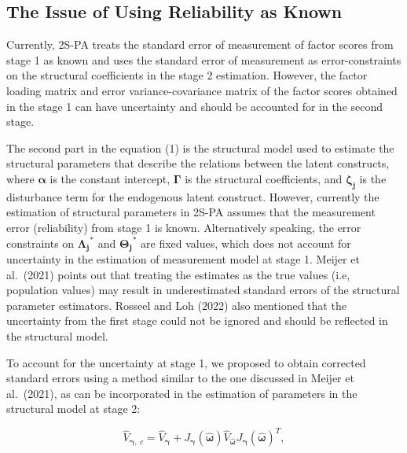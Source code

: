 \documentclass[
  man]{apa7}
\begin{document}
\hypertarget{the-issue-of-using-reliability-as-known}{%
\subsection{The Issue of Using Reliability as Known}\label{the-issue-of-using-reliability-as-known}}

Currently, 2S-PA treats the standard error of measurement of factor scores from stage 1 as known and uses the standard error of measurement as error-constraints on the structural coefficients in the stage 2 estimation. However, the factor loading matrix and error variance-covariance matrix of the factor scores obtained in the stage 1 can have uncertainty and should be accounted for in the second stage.

The second part in the equation (1) is the structural model used to estimate the structural parameters that describe the relations between the latent constructs, where \(\boldsymbol{\alpha}\) is the constant intercept, \(\boldsymbol{\Gamma}\) is the structural coefficients, and \(\boldsymbol{\zeta_{j}}\) is the disturbance term for the endogenous latent construct. However, currently the estimation of structural parameters in 2S-PA assumes that the measurement error (reliability) from stage 1 is known. Alternatively speaking, the error constraints on \(\boldsymbol{\Lambda_{j}}^\text{*}\) and \(\boldsymbol{\Theta_{j}}^\text{*}\) are fixed values, which does not account for uncertainty in the estimation of measurement model at stage 1. Meijer et al.~(2021) points out that treating the estimates as the true values (i.e, population values) may result in underestimated standard errors of the structural parameter estimators. Rosseel and Loh (2022) also mentioned that the uncertainty from the first stage could not be ignored and should be reflected in the structural model.

To account for the uncertainty at stage 1, we proposed to obtain corrected standard errors using a method similar to the one discussed in Meijer et al.~(2021), as can be incorporated in the estimation of parameters in the structural model at stage 2:

\begin{equation}
\hat{V}_{\boldsymbol{\gamma},\ c} = \hat{V}_{\boldsymbol{\gamma}} + J_{\boldsymbol{\gamma}}(\hat{\boldsymbol{\omega}})\hat{V}_{\boldsymbol{\hat{\boldsymbol{\omega}}}}J_{\boldsymbol{\gamma}}(\hat{\boldsymbol{\omega}})^T,
\end{equation}
\end{document}

